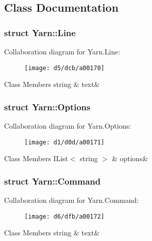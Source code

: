 \subsection{Class Documentation}
\label{de/db9/a00159}
\hypertarget{a00026_de/db9/a00159}{}
\subsubsection{struct Yarn\-:\-:Line}


Collaboration diagram for Yarn.\-Line\-:
\nopagebreak
\begin{figure}[H]
\begin{center}
\leavevmode
\texttt{[image: d5/dcb/a00170]}
\end{center}
\end{figure}
\begin{DoxyFields}{Class Members}
\hypertarget{a00026_a81d1f04bbb4cf6642d2bd685bda1da20}{string}\label{a00026_a81d1f04bbb4cf6642d2bd685bda1da20}
&
text&
\\
\hline

\end{DoxyFields}
\label{d6/d7d/a00161}
\hypertarget{a00026_d6/d7d/a00161}{}
\subsubsection{struct Yarn\-:\-:Options}


Collaboration diagram for Yarn.\-Options\-:
\nopagebreak
\begin{figure}[H]
\begin{center}
\leavevmode
\texttt{[image: d1/d0d/a00171]}
\end{center}
\end{figure}
\begin{DoxyFields}{Class Members}
\hypertarget{a00026_ae8c616d923ceeeed192a9436c55d9917}{I\-List$<$ string $>$}\label{a00026_ae8c616d923ceeeed192a9436c55d9917}
&
options&
\\
\hline

\end{DoxyFields}
\label{d2/d34/a00156}
\hypertarget{a00026_d2/d34/a00156}{}
\subsubsection{struct Yarn\-:\-:Command}


Collaboration diagram for Yarn.\-Command\-:
\nopagebreak
\begin{figure}[H]
\begin{center}
\leavevmode
\texttt{[image: d6/dfb/a00172]}
\end{center}
\end{figure}
\begin{DoxyFields}{Class Members}
\hypertarget{a00026_a8564e5104566e145f5d917ec846444d9}{string}\label{a00026_a8564e5104566e145f5d917ec846444d9}
&
text&
\\
\hline

\end{DoxyFields}
